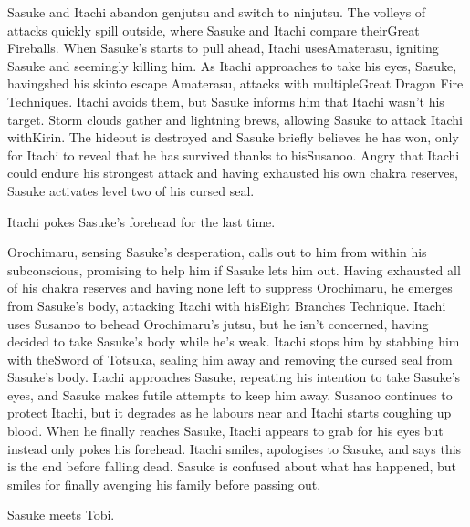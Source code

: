 \documentclass[a4paper,12pt]{article}
\begin{document}
Sasuke and Itachi abandon genjutsu and switch to ninjutsu. The volleys of attacks quickly spill outside, where Sasuke and Itachi compare theirGreat Fireballs. When Sasuke's starts to pull ahead, Itachi usesAmaterasu, igniting Sasuke and seemingly killing him. As Itachi approaches to take his eyes, Sasuke, havingshed his skinto escape Amaterasu, attacks with multipleGreat Dragon Fire Techniques. Itachi avoids them, but Sasuke informs him that Itachi wasn't his target. Storm clouds gather and lightning brews, allowing Sasuke to attack Itachi withKirin. The hideout is destroyed and Sasuke briefly believes he has won, only for Itachi to reveal that he has survived thanks to hisSusanoo. Angry that Itachi could endure his strongest attack and having exhausted his own chakra reserves, Sasuke activates level two of his cursed seal.\\ \par \vspace{0.5cm}

Itachi pokes Sasuke's forehead for the last time.\\ \par \vspace{0.5cm}

Orochimaru, sensing Sasuke's desperation, calls out to him from within his subconscious, promising to help him if Sasuke lets him out. Having exhausted all of his chakra reserves and having none left to suppress Orochimaru, he emerges from Sasuke's body, attacking Itachi with hisEight Branches Technique. Itachi uses Susanoo to behead Orochimaru's jutsu, but he isn't concerned, having decided to take Sasuke's body while he's weak. Itachi stops him by stabbing him with theSword of Totsuka, sealing him away and removing the cursed seal from Sasuke's body. Itachi approaches Sasuke, repeating his intention to take Sasuke's eyes, and Sasuke makes futile attempts to keep him away. Susanoo continues to protect Itachi, but it degrades as he labours near and Itachi starts coughing up blood. When he finally reaches Sasuke, Itachi appears to grab for his eyes but instead only pokes his forehead. Itachi smiles, apologises to Sasuke, and says this is the end before falling dead. Sasuke is confused about what has happened, but smiles for finally avenging his family before passing out.\\ \par \vspace{0.5cm}

Sasuke meets Tobi.\\ \par \vspace{0.5cm}
\end{document}
